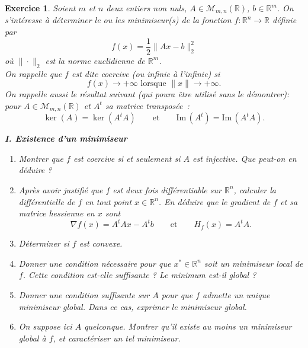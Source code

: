 \documentclass[11pt]{article}
\newcommand{\Mm}{\mathcal{M}}
\renewcommand{\Im}{{\mathrm{Im} \, }}
\newcommand{\bR}{\mathbb R}
\theoremstyle{exostyle}
\newtheorem{exercice}{Exercice}
\begin{document}

\begin{exercice}
  Soient $m$ et $n$ deux entiers non nuls, $A\in \Mm_{m,n}(\bR)$, $b\in \bR^m$. On s'intéresse à déterminer le ou les minimiseur(s) de la fonction $f:\bR^n \rightarrow \bR$ définie par
$$f(x) = \frac{1}{2} \|A x-b\|_2^2 $$
où $\|\cdot \|_2$ est la norme euclidienne de $\bR^m$. \\
 On rappelle que $f$ est dite \emph{coercive} (ou \emph{infinie à l'infinie}) si 
  $$f(x) \to + \infty  \mbox{ lorsque }\|x\| \to +\infty.$$
  On rappelle aussi le résultat suivant (qui poura être utilisé sans le démontrer): pour  $A\in \Mm_{m,n}(\bR)$ et $A^t$ sa matrice transposée~:
  $$\ker(A)= \ker(A^t A) \qquad \mbox{et}\qquad \Im(A^t)= \Im(A^tA).$$
  
\medskip

{\bf I. Existence d'un minimiseur}
\begin{enumerate}
 \item Montrer que $f$ est  coercive si et seulement si $A$ est injective. 
       Que peut-on en déduire ?
%
 \item \label{q:calcul-gradient} 
 Après avoir justifié que $f$ est deux fois différentiable sur $\bR^n$, 
calculer la différentielle de $f$ en tout point  $x \in \bR^n$. En déduire que 
le gradient de $f$ et sa matrice hessienne en $x$ sont 
$$
\nabla f(x) = A^t A x - A^t b \qquad \mbox{et} \qquad H_{f}(x) =  A^t A.
$$
 \item Déterminer si $f$ est convexe.
  \item Donner une condition nécessaire pour que $x^* \in \bR^n$ soit un minimiseur local de $f$. Cette condition est-elle suffisante ? Le minimum est-il global ?
  \item 
  Donner une condition suffisante sur $A$ pour que $f$ admette un unique minimiseur global. Dans ce cas, exprimer le minimiseur global.
  \item On suppose ici $A$ quelconque. Montrer qu'il existe au moins un minimiseur global à $f$, et caractériser un tel minimiseur.
\end{enumerate}  


\end{exercice}
\end{document}
